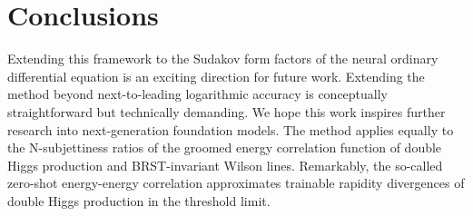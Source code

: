 \section{Conclusions}\label{sec:conclusions}

Extending this framework to the Sudakov form factors of the neural
ordinary differential equation is an exciting direction for future work.
Extending the method beyond next-to-leading logarithmic accuracy is
conceptually straightforward but technically demanding. We hope this
work inspires further research into next-generation foundation models.
The method applies equally to the N-subjettiness ratios of the groomed
energy correlation function of double Higgs production and
BRST-invariant Wilson lines. Remarkably, the so-called zero-shot
energy-energy correlation approximates trainable rapidity divergences of
double Higgs production in the threshold limit.

